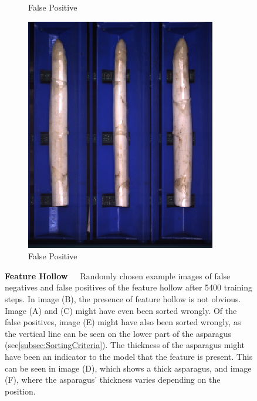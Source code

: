 \begin{figure}[!htb]
\begin{subfigure}{0.3\textwidth}
		\vspace{-5pt}
		\caption{False Positive}
	\end{subfigure}
	\begin{subfigure}{0.3\textwidth}
		\includegraphics[width=0.9\linewidth]{Figures/chapter04/hollow_falsepositive_03.png}
		\vspace{-5pt}
		\caption{False Positive}
	\end{subfigure}
	\vspace{-5pt}
\caption[Single-Label CNN Example Images Feature Hollow]{\textbf{Feature Hollow}~~~Randomly chosen example images of false negatives and false positives of the feature hollow after 5400 training steps. In image (B), the presence of feature hollow is not obvious. Image (A) and (C) might have even been sorted wrongly. Of the false positives, image (E) might have also been sorted wrongly, as the vertical line can be seen on the lower part of the asparagus (see\autoref{subsec:SortingCriteria}). The thickness of the asparagus might have been an indicator to the model that the feature is present. This can be seen in image (D), which shows a thick asparagus, and image (F), where the asparagus' thickness varies depending on the position.}
    \label{fig:ExampleImagesHollow}
\end{figure}

